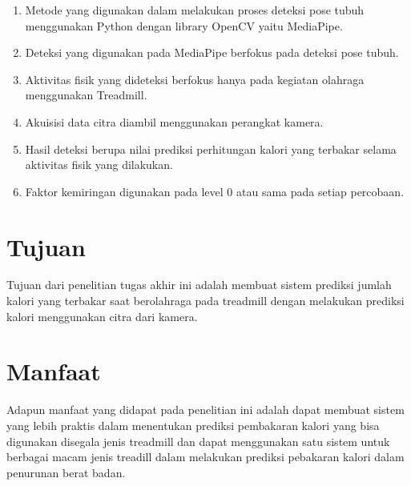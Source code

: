 \begin{enumerate}[nolistsep]

  \item Metode yang digunakan dalam melakukan proses deteksi pose tubuh menggunakan Python dengan library OpenCV yaitu MediaPipe.

  \item Deteksi yang digunakan pada MediaPipe berfokus pada deteksi pose tubuh.

  \item Aktivitas fisik yang dideteksi berfokus hanya pada kegiatan olahraga menggunakan Treadmill.

  \item Akuisisi data citra diambil menggunakan perangkat kamera.

  \item Hasil deteksi berupa nilai prediksi perhitungan kalori yang terbakar selama aktivitas fisik yang dilakukan.

  \item Faktor kemiringan digunakan pada level 0 atau sama pada setiap percobaan.

\end{enumerate}

\section{Tujuan}
\label{sec:Tujuan}

Tujuan dari penelitian tugas akhir ini adalah membuat sistem prediksi jumlah kalori yang terbakar saat berolahraga pada treadmill dengan melakukan prediksi kalori menggunakan citra dari kamera.


\section{Manfaat}

Adapun manfaat yang didapat pada penelitian ini adalah dapat membuat sistem yang lebih praktis dalam menentukan prediksi pembakaran kalori yang bisa digunakan disegala jenis treadmill dan dapat menggunakan satu sistem untuk berbagai macam jenis treadill dalam melakukan prediksi pebakaran kalori dalam penurunan berat badan.
